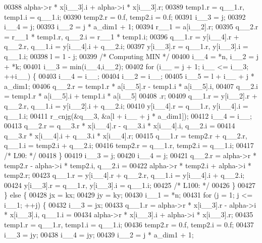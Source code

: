 \begin{DoxyCode}
00388              alpha->r * x[i\_\_3].i + alpha->i * x[i\_\_3].r;
00389         temp1.r = q\_\_1.r, temp1.i = q\_\_1.i;
00390         temp2.r = 0.f, temp2.i = 0.f;
00391         i\_\_3 = j;
00392         i\_\_4 = j;
00393         i\_\_2 = j * a\_dim1 + 1;
00394         r\_\_1 = a[i\_\_2].r;
00395         q\_\_2.r = r\_\_1 * temp1.r, q\_\_2.i = r\_\_1 * temp1.i;
00396         q\_\_1.r = y[i\_\_4].r + q\_\_2.r, q\_\_1.i = y[i\_\_4].i + q\_\_2.i;
00397         y[i\_\_3].r = q\_\_1.r, y[i\_\_3].i = q\_\_1.i;
00398         l = 1 - j;
00399 \textcolor{comment}{/* Computing MIN */}
00400         i\_\_4 = *n, i\_\_2 = j + *k;
00401         i\_\_3 = min(i\_\_4,i\_\_2);
00402         \textcolor{keywordflow}{for} (i\_\_ = j + 1; i\_\_ <= i\_\_3; ++i\_\_) \{
00403             i\_\_4 = i\_\_;
00404             i\_\_2 = i\_\_;
00405             i\_\_5 = l + i\_\_ + j * a\_dim1;
00406             q\_\_2.r = temp1.r * a[i\_\_5].r - temp1.i * a[i\_\_5].i, 
00407                 q\_\_2.i = temp1.r * a[i\_\_5].i + temp1.i * a[i\_\_5]
00408                 .r;
00409             q\_\_1.r = y[i\_\_2].r + q\_\_2.r, q\_\_1.i = y[i\_\_2].i + q\_\_2.i;
00410             y[i\_\_4].r = q\_\_1.r, y[i\_\_4].i = q\_\_1.i;
00411             r\_cnjg(&q\_\_3, &a[l + i\_\_ + j * a\_dim1]);
00412             i\_\_4 = i\_\_;
00413             q\_\_2.r = q\_\_3.r * x[i\_\_4].r - q\_\_3.i * x[i\_\_4].i, q\_\_2.i =
00414                  q\_\_3.r * x[i\_\_4].i + q\_\_3.i * x[i\_\_4].r;
00415             q\_\_1.r = temp2.r + q\_\_2.r, q\_\_1.i = temp2.i + q\_\_2.i;
00416             temp2.r = q\_\_1.r, temp2.i = q\_\_1.i;
00417 \textcolor{comment}{/* L90: */}
00418         \}
00419         i\_\_3 = j;
00420         i\_\_4 = j;
00421         q\_\_2.r = alpha->r * temp2.r - alpha->i * temp2.i, q\_\_2.i = 
00422             alpha->r * temp2.i + alpha->i * temp2.r;
00423         q\_\_1.r = y[i\_\_4].r + q\_\_2.r, q\_\_1.i = y[i\_\_4].i + q\_\_2.i;
00424         y[i\_\_3].r = q\_\_1.r, y[i\_\_3].i = q\_\_1.i;
00425 \textcolor{comment}{/* L100: */}
00426         \}
00427     \} \textcolor{keywordflow}{else} \{
00428         jx = kx;
00429         jy = ky;
00430         i\_\_1 = *n;
00431         \textcolor{keywordflow}{for} (j = 1; j <= i\_\_1; ++j) \{
00432         i\_\_3 = jx;
00433         q\_\_1.r = alpha->r * x[i\_\_3].r - alpha->i * x[i\_\_3].i, q\_\_1.i =
00434              alpha->r * x[i\_\_3].i + alpha->i * x[i\_\_3].r;
00435         temp1.r = q\_\_1.r, temp1.i = q\_\_1.i;
00436         temp2.r = 0.f, temp2.i = 0.f;
00437         i\_\_3 = jy;
00438         i\_\_4 = jy;
00439         i\_\_2 = j * a\_dim1 + 1;

\end{DoxyCode}
